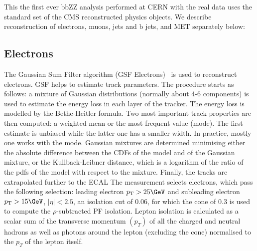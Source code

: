 This the first ever bbZZ analysis performed at CERN with the real data uses the standard set of the CMS
reconstructed physics objects. We describe reconstruction of
electrons, muons, jets and b jets, and MET separately below:



\subsection{Electrons\label{sec:electrons}}
The Gaussian Sum Filter algorithm (GSF
Electrons)~\cite{Khachatryan:2015hwa} is used to reconstruct
electrons. GSF helps to estimate track parameters. The procedure starts as follows: a mixture of Gaussian distributions (normally about 4-6 components) \cite{GSF} is used to estimate the energy loss in each layer of the tracker. The energy loss is modelled by the Bethe-Heitler formula. Two most important track properties are then computed: a weighted mean or the most frequent value (mode). The first estimate is unbiased while the latter one has a smaller width. In practice, mostly one works with the mode. Gaussian mixtures are determined minimising either the absolute difference between the CDFs of the model and of the Gaussian mixture, or the Kullback-Leibner distance, which is a logarithm of the ratio of the pdfs of the model with respect to the mixture. Finally, the tracks are extrapolated further to the ECAL The measurement selects electrons, which pass the following selection: leading electron $\pt>25\GeV$ and subleading electron $\pt>15\GeV$, $|\eta|<2.5$, 
an isolation cut of 0.06, for which the cone
of $0.3$ is used to compute the $\rho$-subtracted PF
isolation. Lepton isolation is calculated as a scalar sum of
the transverse momentum $(p_{T})$ of all the charged and
neutral hadrons as well as photons around the lepton
(excluding the cone) normalised to the $p_{T}$ of the lepton
itself. 

        


